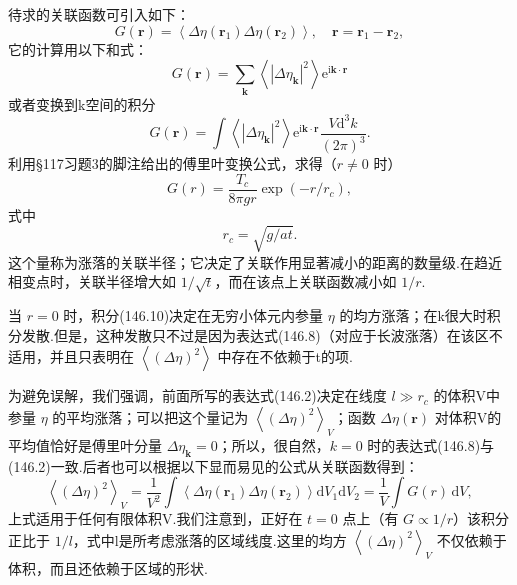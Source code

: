 待求的关联函数可引入如下：
\begin{equation}
  G(\boldsymbol{r})=\left\langle\Delta\eta(\boldsymbol{r}_1)
  \Delta\eta(\boldsymbol{r}_2)\right\rangle,\quad
  \boldsymbol{r}=\boldsymbol{r}_1-\boldsymbol{r}_2,
\end{equation}
它的计算用以下和式：
\begin{equation*}
  G(\boldsymbol{r})=\sum_{\boldsymbol{k}}
  \left\langle\left|\Delta\eta_{\boldsymbol{k}}\right|^2\right\rangle
  \mathrm{e}^{\mathrm{i}\boldsymbol{k}\cdot\boldsymbol{r}}
\end{equation*}
或者变换到k空间的积分
\begin{equation}
  G(\boldsymbol{r})=\int\left\langle\left|\Delta\eta_{\boldsymbol{k}}\right|^2\right\rangle
  \mathrm{e}^{\mathrm{i}\boldsymbol{k}\cdot\boldsymbol{r}}
  \frac{V\mathrm{d}^3k}{(2\pi)^3}.
\end{equation}
利用§117习题3的脚注给出的傅里叶变换公式，求得（$r\neq0$ 时）
\begin{equation}
  G(r)=\frac{T_c}{8\pi gr}\exp(-r/r_c),
\end{equation}
式中
\begin{equation}
  r_c=\sqrt{g/at}.
\end{equation}
这个量称为涨落的关联半径；它决定了关联作用显著减小的距离的数量级.在趋近相变点时，关联半径增大如 $1/\sqrt{t}$，而在该点上关联函数减小如 $1/r$.

当 $r=0$ 时，积分(146.10)决定在无穷小体元内参量 $\eta$ 的均方涨落；在k很大时积分发散.但是，这种发散只不过是因为表达式(146.8)（对应于长波涨落）在该区不适用，并且只表明在 $\left\langle(\Delta\eta)^2\right\rangle$ 中存在不依赖于t的项.

为避免误解，我们强调，前面所写的表达式(146.2)决定在线度 $l\gg r_c$ 的体积V中参量 $\eta$ 的平均涨落；可以把这个量记为 $\left\langle(\Delta\eta)^2\right\rangle_V$；函数 $\Delta\eta(\boldsymbol{r})$ 对体积V的平均值恰好是傅里叶分量 $\Delta\eta_{\boldsymbol{k}}=0$；所以，很自然，$k=0$ 时的表达式(146.8)与(146.2)一致.后者也可以根据以下显而易见的公式从关联函数得到：
\begin{equation}
  \left\langle(\Delta\eta)^2\right\rangle_V
  =\frac{1}{V^2}\int\left\langle\Delta\eta(\boldsymbol{r}_1)
  \Delta\eta(\boldsymbol{r}_2)\right\rangle\mathrm{d}V_1\mathrm{d}V_2
  =\frac{1}{V}\int G(r)\,\mathrm{d}V,
\end{equation}
上式适用于任何有限体积V.我们注意到，正好在 $t=0$ 点上（有 $G\propto1/r$）该积分正比于 $1/l$，式中l是所考虑涨落的区域线度.这里的均方 $\left\langle(\Delta\eta)^2\right\rangle_V$ 不仅依赖于体积，而且还依赖于区域的形状.

